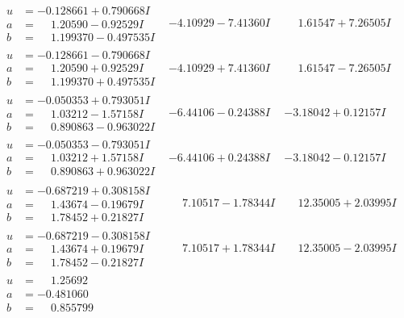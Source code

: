 \documentclass[1p]{elsarticle_modified}
\theoremstyle{definition}
\begin{document}
$$\begin{array}{c|c|c}
\begin{aligned}
u &= -0.128661 + 0.790668 I \\
a &= \phantom{-}1.20590 - 0.92529 I \\
b &= \phantom{-}1.199370 - 0.497535 I\end{aligned}
 & -4.10929 - 7.41360 I & \phantom{-}1.61547 + 7.26505 I \\ \hline\begin{aligned}
u &= -0.128661 - 0.790668 I \\
a &= \phantom{-}1.20590 + 0.92529 I \\
b &= \phantom{-}1.199370 + 0.497535 I\end{aligned}
 & -4.10929 + 7.41360 I & \phantom{-}1.61547 - 7.26505 I \\ \hline\begin{aligned}
u &= -0.050353 + 0.793051 I \\
a &= \phantom{-}1.03212 - 1.57158 I \\
b &= \phantom{-}0.890863 - 0.963022 I\end{aligned}
 & -6.44106 - 0.24388 I & -3.18042 + 0.12157 I \\ \hline\begin{aligned}
u &= -0.050353 - 0.793051 I \\
a &= \phantom{-}1.03212 + 1.57158 I \\
b &= \phantom{-}0.890863 + 0.963022 I\end{aligned}
 & -6.44106 + 0.24388 I & -3.18042 - 0.12157 I \\ \hline\begin{aligned}
u &= -0.687219 + 0.308158 I \\
a &= \phantom{-}1.43674 - 0.19679 I \\
b &= \phantom{-}1.78452 + 0.21827 I\end{aligned}
 & \phantom{-}7.10517 - 1.78344 I & \phantom{-}12.35005 + 2.03995 I \\ \hline\begin{aligned}
u &= -0.687219 - 0.308158 I \\
a &= \phantom{-}1.43674 + 0.19679 I \\
b &= \phantom{-}1.78452 - 0.21827 I\end{aligned}
 & \phantom{-}7.10517 + 1.78344 I & \phantom{-}12.35005 - 2.03995 I \\ \hline\begin{aligned}
u &= \phantom{-}1.25692\phantom{ +0.000000I} \\
a &= -0.481060\phantom{ +0.000000I} \\
b &= \phantom{-}0.855799\phantom{ +0.000000I}\end{aligned}

\end{array}$$
\end{document}
